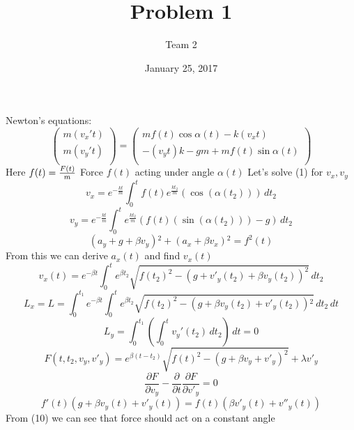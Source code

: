 \documentclass[a4paper,11pt]{scrartcl}
\title{Problem 1}
\author{Team 2}
\date{January 25, 2017}
\begin{document}
\maketitle
Newton's equations:
\begin{equation}
\left(
\begin{array}{c}
 m \left(v_x' t\right) \\
 m \left(v_y' t\right) \\
\end{array}
\right)=\left(
\begin{array}{c}
 m f(t) \cos  \alpha  (t)   -k \left(v_x t\right) \\
 -\left(v_y t\right) k-g m+m  f(t)  \sin  \alpha ( t) \\
\end{array}
\right)
\end{equation}
Here $f(t) = {F(t) \over m}$\newline
Force $f(t)$ acting under angle $\alpha(t)$ 
Let's solve (1) for $v_x, v_y$
\begin{equation}
v_x = 
e^{-\frac{k t}{m}} \int_0^t  f(t)  e^{\frac{k t_2}{m}} (\cos  (\alpha(t_2) )) \, dt_2
\end{equation}
\begin{equation}
v_y = e^{-\frac{k t}{m}} \int_0^t e^{\frac{k t_2}{m}} ( f(t)  (\sin  (\alpha(t_2)))-g) \, dt_2
\end{equation}
\begin{equation}
\left(a_y+g+\beta  v_y\right){}^2+\left(a_x+\beta  v_x\right){}^2= f^2(t) 
\end{equation}
From this we can derive $a_x(t)$ and find $v_x(t)$
\begin{equation}
v_x(t) = e^{- \beta t} \int_0^t e^{\beta  t_2} \sqrt{f(t_2)^2-\left(g+v'_y(t_2)+\beta  v_y(t_2)\right)^2} \, dt_2
\end{equation}
\linebreak
\begin{equation}
L_x = L =\int_0^{t_1} e^{- \beta t} \int_0^t e^{\beta  t_2} \sqrt{f(t_2)^2-\left(g+\beta   v_y\left(t_2\right)+ v'_y\left(t_2\right)\right){}^2} \, dt_2 \, dt
\end{equation}
\begin{equation}
L_y = \int_0^{t_1} \left(\int_0^t  v_y'(t_2) \, dt_2\right) \, dt=0
\end{equation}
\linebreak
\begin{equation}
F(t,t_2,v_y,v'_y) = e^{\beta  (t-t_2)} \sqrt{f(t)^2-(g+\beta  v_y+v'_y)^2}+\lambda  v'_y
\end{equation}
\begin{equation}
\frac{\partial F}{\partial v_y} - \frac{\partial}{\partial t}\frac{\partial F}{\partial v'_y} = 0
\end{equation}
\begin{equation}
f'\left(t \right) \left(g+\beta   v_y\left(t\right)+ v'_y\left( t\right)\right)= f(t)  \left(\beta  v'_y\left(t \right)+ v''_y\left( t\right)\right)
\end{equation}
From (10) we can see that force should act on a constant angle \linebreak 
\end{document}
